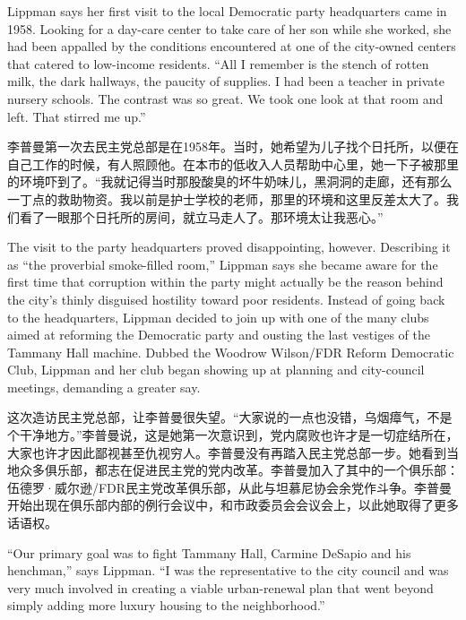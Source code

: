 \ifdefined\eng
Lippman says her first visit to the local Democratic party headquarters came in 1958. Looking for a day-care center to take care of her son while she worked, she had been appalled by the conditions encountered at one of the city-owned centers that catered to low-income residents. ``All I remember is the stench of rotten milk, the dark hallways, the paucity of supplies. I had been a teacher in private nursery schools. The contrast was so great. We took one look at that room and left. That stirred me up.''
\fi

\ifdefined\chs
李普曼第一次去民主党总部是在1958年。当时，她希望为儿子找个日托所，以便在自己工作的时候，有人照顾他。在本市的低收入人员帮助中心里，她一下子被那里的环境吓到了。``我就记得当时那股酸臭的坏牛奶味儿，黑洞洞的走廊，还有那么一丁点的救助物资。我以前是护士学校的老师，那里的环境和这里反差太大了。我们看了一眼那个日托所的房间，就立马走人了。那环境太让我恶心。''
\fi

\ifdefined\eng
The visit to the party headquarters proved disappointing, however. Describing it as ``the proverbial smoke-filled room,'' Lippman says she became aware for the first time that corruption within the party might actually be the reason behind the city's thinly disguised hostility toward poor residents. Instead of going back to the headquarters, Lippman decided to join up with one of the many clubs aimed at reforming the Democratic party and ousting the last vestiges of the Tammany Hall machine. Dubbed the Woodrow Wilson/FDR Reform Democratic Club, Lippman and her club began showing up at planning and city-council meetings, demanding a greater say.
\fi

\ifdefined\chs
这次造访民主党总部，让李普曼很失望。``大家说的一点也没错，乌烟瘴气，不是个干净地方。''李普曼说，这是她第一次意识到，党内腐败也许才是一切症结所在，大家也许才因此鄙视甚至仇视穷人。李普曼没有再踏入民主党总部一步。她看到当地众多俱乐部，都志在促进民主党的党内改革。李普曼加入了其中的一个俱乐部：伍德罗·威尔逊/FDR民主党改革俱乐部，从此与坦慕尼协会余党作斗争。李普曼开始出现在俱乐部内部的例行会议中，和市政委员会会议会上，以此她取得了更多话语权。
\fi

\ifdefined\eng
``Our primary goal was to fight Tammany Hall, Carmine DeSapio and his henchman,'' says Lippman. ``I was the representative to the city council and was very much involved in creating a viable urban-renewal plan that went beyond simply adding more luxury housing to the neighborhood.''
\fi

